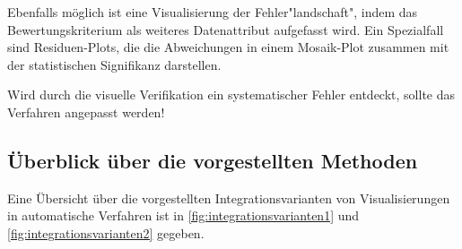 				Ebenfalls möglich ist eine Visualisierung der Fehler"landschaft", indem das Bewertungskriterium als weiteres Datenattribut aufgefasst wird. Ein Spezialfall sind Residuen-Plots, die die Abweichungen in einem Mosaik-Plot zusammen mit der statistischen Signifikanz darstellen.

				Wird durch die visuelle Verifikation ein systematischer Fehler entdeckt, sollte das Verfahren angepasst werden!

		\subsection{Überblick über die vorgestellten Methoden}
			\label{subsec:visAutoZsm}

			Eine Übersicht über die vorgestellten Integrationsvarianten von Visualisierungen in automatische Verfahren ist in \autoref{fig:integrationsvarianten1} und \ref{fig:integrationsvarianten2} gegeben.


